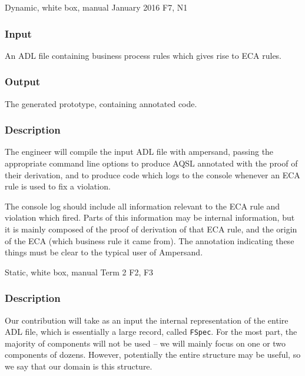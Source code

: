 \documentclass[12pt]{report}
\begin{document}



{Dynamic, white box, manual}
{January 2016}
{F7, N1}
\vspace{-12pt}\subsubsection*{Input}
An ADL file containing business process rules which gives rise to ECA rules. 

\vspace{-12pt}\subsubsection*{Output} 
The generated prototype, containing annotated code.

\vspace{-12pt}\subsubsection*{Description}
The engineer will compile the input ADL file with ampersand, passing the
appropriate command line options
to produce AQSL annotated with the proof of
their derivation, and to produce code which logs to the console whenever an ECA
rule is used to fix a violation.

The console log should include all information relevant to the ECA rule and
violation which fired. 
Parts of this information may be internal information,
but it is mainly composed of the proof of derivation of that ECA rule, and the
origin of the ECA (which business rule it came from). The annotation indicating
these things must be clear to the typical user of Ampersand.

{Static, white box, manual}
{Term 2}
{F2, F3}
\vspace{-12pt}\subsubsection*{Description}
Our contribution will take as an input the internal representation of the entire
ADL file, which is essentially a large record, called \verb|FSpec|. For the most
part, the majority of components will not be used -- we will mainly focus on one
or two components of dozens. However, potentially the entire structure may be
useful, so we say that our domain is this structure.
\end{document}
